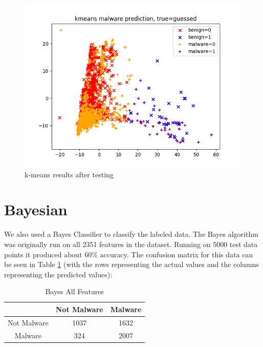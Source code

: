 \documentclass[12pt]{article}
\begin{document}
\begin{figure}[ht]
\centering
\includegraphics[width=.5\textheight]{kmeans_guesses}
\caption{k-means results after testing}
\label{fig:kmeans_testing}
\end{figure}
\section{Bayesian}
\par
We also used a Bayes Classifier to classify the labeled data. The Bayes algorithm was originally run on all 2351 features in the dataset. Running on 5000 test data points it produced about 60\% accuracy. The confusion matrix for this data can be seen in Table \ref{tab:bayes_all_features} (with the rows representing the actual values and the columns representing the predicted values): 
\begin{table}[]
    \centering
    \begin{tabular}{|c|c|c|}
        \hline
         & Not Malware & Malware  \\
         \hline
        Not Malware & 1037 & 1632 \\
        \hline
        Malware & 324 & 2007 \\
        \hline
    \end{tabular}
    \caption{Bayes All Features}
    \label{tab:bayes_all_features}
\end{table}
\end{document}
